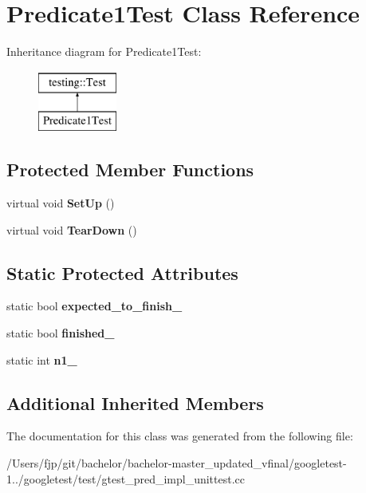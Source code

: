 \hypertarget{class_predicate1_test}{}\section{Predicate1\+Test Class Reference}
\label{class_predicate1_test}
Inheritance diagram for Predicate1\+Test\+:\begin{figure}[H]
\begin{center}
\leavevmode
\includegraphics[height=2.000000cm]{class_predicate1_test}
\end{center}
\end{figure}
\subsection*{Protected Member Functions}
\begin{DoxyCompactItemize}
\item 
\mbox{\label{class_predicate1_test_a481704a09f73a37158513f9a336dbdd9}} 
virtual void {\bfseries Set\+Up} ()
\item 
\mbox{\label{class_predicate1_test_ad2974af5c6abc508847c3a9912b24a90}} 
virtual void {\bfseries Tear\+Down} ()
\end{DoxyCompactItemize}
\subsection*{Static Protected Attributes}
\begin{DoxyCompactItemize}
\item 
\mbox{\label{class_predicate1_test_ad91cfa58e6352d53abacce32df2ef635}} 
static bool {\bfseries expected\+\_\+to\+\_\+finish\+\_\+}
\item 
\mbox{\label{class_predicate1_test_a6d45fb2d1f01a5c8baf28f60039c244e}} 
static bool {\bfseries finished\+\_\+}
\item 
\mbox{\label{class_predicate1_test_a528d9f7f618b17802962a3824eea11e3}} 
static int {\bfseries n1\+\_\+}
\end{DoxyCompactItemize}
\subsection*{Additional Inherited Members}


The documentation for this class was generated from the following file\+:\begin{DoxyCompactItemize}
\item 
/\+Users/fjp/git/bachelor/bachelor-\/master\+\_\+updated\+\_\+vfinal/googletest-\/1../googletest/test/gtest\+\_\+pred\+\_\+impl\+\_\+unittest.\+cc\end{DoxyCompactItemize}
